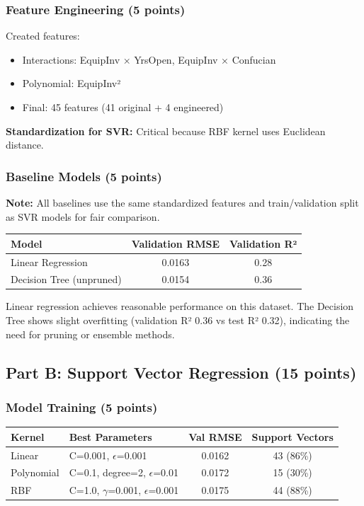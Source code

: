 \documentclass[12pt,a4paper]{article}
\theoremstyle{definition}
\begin{document}
\subsubsection{Feature Engineering (5 points)}

Created features:
\begin{itemize}
\item Interactions: EquipInv × YrsOpen, EquipInv × Confucian
\item Polynomial: EquipInv²
\item Final: 45 features (41 original + 4 engineered)
\end{itemize}

\textbf{Standardization for SVR:} Critical because RBF kernel uses Euclidean distance.

\subsubsection{Baseline Models (5 points)}

\textbf{Note:} All baselines use the same standardized features and train/validation split as SVR models for fair comparison.

\begin{center}
\begin{tabular}{|l|c|c|}
\hline
\textbf{Model} & \textbf{Validation RMSE} & \textbf{Validation R²} \\
\hline
Linear Regression & 0.0163 & 0.28 \\
Decision Tree (unpruned) & 0.0154 & 0.36 \\
\hline
\end{tabular}
\end{center}

Linear regression achieves reasonable performance on this dataset. The Decision Tree shows slight overfitting (validation R² 0.36 vs test R² 0.32), indicating the need for pruning or ensemble methods.

\subsection{Part B: Support Vector Regression (15 points)}

\subsubsection{Model Training (5 points)}

\begin{center}
\begin{tabular}{|l|l|c|c|}
\hline
\textbf{Kernel} & \textbf{Best Parameters} & \textbf{Val RMSE} & \textbf{Support Vectors} \\
\hline
Linear & C=0.001, $\epsilon$=0.001 & 0.0162 & 43 (86\%) \\
Polynomial & C=0.1, degree=2, $\epsilon$=0.01 & 0.0172 & 15 (30\%) \\
RBF & C=1.0, $\gamma$=0.001, $\epsilon$=0.001 & 0.0175 & 44 (88\%) \\
\hline
\end{tabular}
\end{center}
\end{document}
